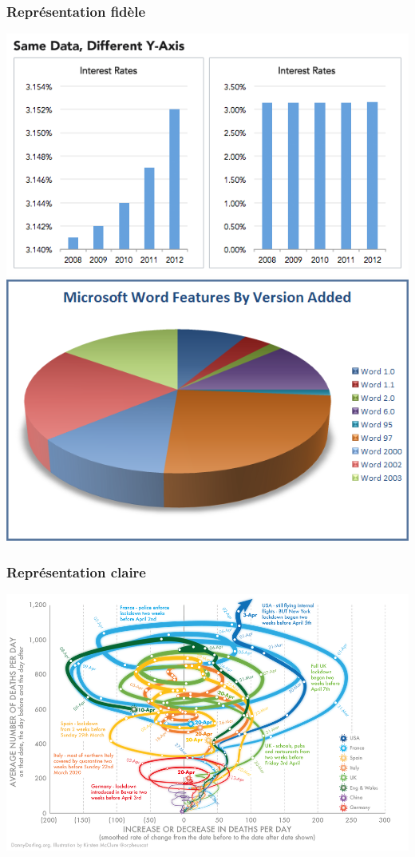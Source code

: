 \documentclass[aspectratio=169]{beamer}
\begin{document}
\begin{frame}[c]\frametitle{Représentation fidèle}
    

\begin{center}
\includegraphics[width=.4\textwidth]{figures/misleading_chart.png}
\hspace{1cm}
\includegraphics[width=.4\textwidth]{figures/misleading-pie-chart.png}
\end{center}

\end{frame}





\begin{frame}[c]\frametitle{Représentation claire}
    

\begin{center}
\includegraphics[scale=.27]{figures/unclear-chart.png} 
\end{center}

\end{frame}
\end{document}
